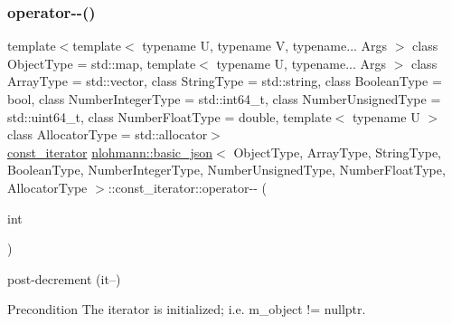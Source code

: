 \subsubsection{\texorpdfstring{operator-\/-\/()}{operator--()}\hspace{0.1cm}{\footnotesize\ttfamily [1/2]}}
{\footnotesize\ttfamily template$<$template$<$ typename U, typename V, typename... Args $>$ class Object\+Type = std\+::map, template$<$ typename U, typename... Args $>$ class Array\+Type = std\+::vector, class String\+Type  = std\+::string, class Boolean\+Type  = bool, class Number\+Integer\+Type  = std\+::int64\+\_\+t, class Number\+Unsigned\+Type  = std\+::uint64\+\_\+t, class Number\+Float\+Type  = double, template$<$ typename U $>$ class Allocator\+Type = std\+::allocator$>$ \\
\hyperlink{classnlohmann_1_1basic__json_1_1const__iterator}{const\+\_\+iterator} \hyperlink{classnlohmann_1_1basic__json}{nlohmann\+::basic\+\_\+json}$<$ Object\+Type, Array\+Type, String\+Type, Boolean\+Type, Number\+Integer\+Type, Number\+Unsigned\+Type, Number\+Float\+Type, Allocator\+Type $>$\+::const\+\_\+iterator\+::operator-\/-\/ (\begin{DoxyParamCaption}\item[{int}]{ }\end{DoxyParamCaption})\hspace{0.3cm}{\ttfamily [inline]}}



post-\/decrement (it--) 

\begin{DoxyPrecond}{Precondition}
The iterator is initialized; i.\+e. {\ttfamily m\+\_\+object != nullptr}. 
\end{DoxyPrecond}
\mbox{\label{classnlohmann_1_1basic__json_1_1const__iterator_adeb2ff3fdf3cc301b72db109934c9199}} 
